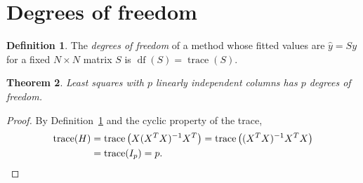 \documentclass[11pt,oneside,openany]{book}
\newtheorem{theorem}{Theorem}[chapter]
\theoremstyle{definition}
\newtheorem{definition}[theorem]{Definition}
\numberwithin{equation}{chapter}
\DeclareMathOperator{\trace}{trace}
\DeclareMathOperator{\df}{df}
\begin{document}
\section{Degrees of freedom}
\begin{definition}\label{def:df}
The \emph{degrees of freedom} of a method whose fitted values are $\hat y = S y$
for a fixed $N \times N$ matrix $S$ is $\df(S) = \trace(S)$.
\end{definition}
\begin{theorem}\label{thm:dfls}
Least squares with $p$ linearly independent columns has $p$ degrees of freedom.
\end{theorem}
\begin{proof}
By Definition~\ref{def:df} and the cyclic property of the trace,
\begin{align}
\trace(H) &= \trace\big(X (X^T X)^{-1} X^T\big) = \trace\big((X^T X)^{-1} X^T X\big) \nonumber \\
           &= \trace(I_p) = p . \label{eq:trace} \qedhere
\end{align}
\end{proof}
\end{document}
